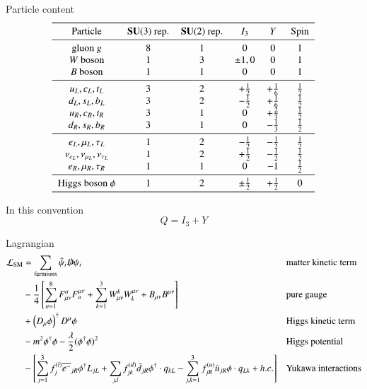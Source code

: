 Particle content
\begin{equation*}
\begin{tabular}{ccc ccc}
   \toprule
   Particle & $\SU(3)$ rep. & $\SU(2)$ rep. & $I_3$ & $Y$ & Spin \\
   \midrule
   gluon $g$ & $8$ & $1$ & $0$ & $0$ & $1$ \\ 
   $W$ boson & $1$ & $3$ & $\pm 1, 0$ & 0 & $1$ \\
   $B$ boson & $1$ & $1$ & $ 0$ & 0 & $1$ \\
   \midrule 
   $u_L, c_L, t_L$ & $3$ & $2$ & $+ \frac{1}{2}$ & $+ \frac{1}{6}$ & $\frac{1}{2}$ \\
   $d_L, s_L, b_L$ & $3$ & $2$ & $- \frac{1}{2}$ & $+ \frac{1}{6}$ & $\frac{1}{2}$ \\
   $u_R, c_R, t_R$ & $3$ & $1$ & $0$ & $+ \frac{2}{3}$ & $\frac{1}{2}$ \\
   $d_R, s_R, b_R$ & $3$ & $1$ & $0$ & $- \frac{1}{3}$ & $\frac{1}{2}$ \\
   \midrule
   $e_L, \mu_L, \tau_L$ & $1$ & $2$ & $-\frac{1}{2}$ & $-\frac{1}{2}$ & $\frac{1}{2}$ \\
   $\nu_{e_L}, \nu_{\mu_L}, \nu_{\tau_L}$ & $1$ & $2$ & $+\frac{1}{2}$ & $- \frac{1}{2}$ & $\frac{1}{2}$ \\
   $e_R, \mu_R, \tau_R$ & $1$ & $1$ & $0$ & $-1$ & $\frac{1}{2}$ \\
   \midrule
   Higgs boson $\phi$ & $1$ & $2$ & $\pm \frac{1}{2}$ & $+\frac{1}{2}$ & $0$ \\
   \bottomrule
\end{tabular}
\end{equation*}

In this convention
\begin{equation}
   Q = I_3 + Y \label{0.13}
\end{equation}

Lagrangian
\begin{align}
      \mathcal{L}_\text{SM} &= \sum_\text{fermions} \bar\psi_i \slashed{D} \psi_i  &&\text{matter kinetic term}\notag \\
                     &- \frac{1}{4} \left[ \sum_{a=1}^8 F_{\mu\nu}^a F_a^{\mu\nu} + \sum_{k=1}^3 W_{\mu\nu}^k W^{\mu\nu}_k + B_{\mu\nu} B^{\mu\nu} \right]  &&\text{pure gauge}\notag \\
                     &+ \left( D_\mu \phi \right)^\dagger D^\mu \phi && \text{Higgs kinetic term}\notag\\
                     &- m^2 \phi^\dagger \phi - \frac{\lambda}{2} (\phi^\dagger \phi)^2 && \text{Higgs potential} \notag \\
                     &- \left[ \sum_{j=1}^3 f_j^{(l)} \overline{e^-}_{jR} \phi^\dagger L_{jL} + \sum_{j,l} f_{jk}^{(d)} \bar d_{jR} \phi^\dagger \cdot q_{kL} - \sum_{j,k=1}^3 f_{jR}^{(u)} \bar u_{jR} \phi \cdot q_{L k} + h.c. \right] && \text{Yukawa interactions}
   \label{0.14}
\end{align}

